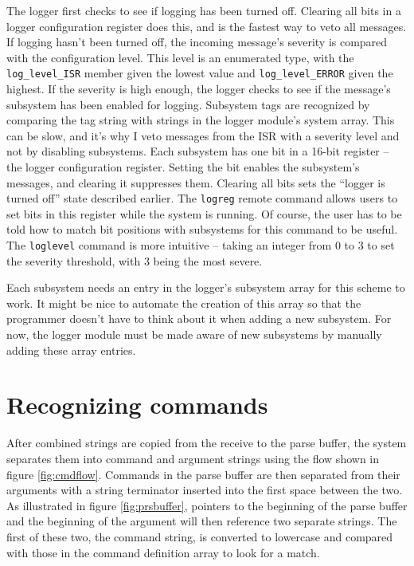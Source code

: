 The logger first checks to see if logging has been turned off.  Clearing all bits in a logger configuration register does this, and is the fastest way to veto all messages.  If logging hasn't been turned off, the incoming message's severity is compared with the configuration level.  This level is an enumerated type, with the \texttt{log\_level\_ISR} member given the lowest value and \texttt{log\_level\_ERROR} given the highest.  If the severity is high enough, the logger checks to see if the message's subsystem has been enabled for logging.  Subsystem tags are recognized by comparing the tag string with strings in the logger module's system array.  This can be slow, and it's why I veto messages from the ISR with a severity level and not by disabling subsystems.  Each subsystem has one bit in a 16-bit register -- the logger configuration register.  Setting the bit enables the subsystem's messages, and clearing it suppresses them.  Clearing all bits sets the ``logger is turned off'' state described earlier.  The \texttt{logreg} remote command allows users to set bits in this register while the system is running.  Of course, the user has to be told how to match bit positions with subsystems for this command to be useful.  The \texttt{loglevel} command is more intuitive -- taking an integer from 0 to 3 to set the severity threshold, with 3 being the most severe.   

Each subsystem needs an entry in the logger's subsystem array for this scheme to work.  It might be nice to automate the creation of this array so that the programmer doesn't have to think about it when adding a new subsystem.  For now, the logger module must be made aware of new subsystems by manually adding these array entries.

\section{Recognizing commands}
After combined strings are copied from the receive to the parse buffer, the system separates them into command and argument strings using the flow shown in figure \ref{fig:cmdflow}.  Commands in the parse buffer are then separated from their arguments with a string terminator inserted into the first space between the two.  As illustrated in figure \ref{fig:prsbuffer}, pointers to the beginning of the parse buffer and the beginning of the argument will then reference two separate strings.  The first of these two, the command string, is converted to lowercase and compared with those in the command definition array to look for a match.

